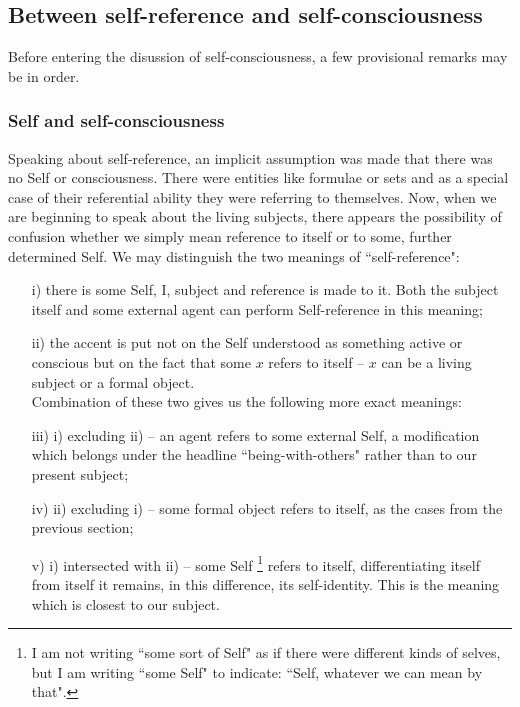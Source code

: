 \subsection{Between self-reference and self-consciousness}
Before entering the disussion of self-consciousness, a few provisional remarks may be in order.

\subsubsection{Self and self-consciousness}
Speaking about self-reference, an implicit assumption was made 
that there was no Self or consciousness. There were entities like formulae or sets and as a special case of their 
referential ability they were referring to themselves. Now, when we are beginning to speak about the living 
subjects, there appears the possibility of confusion whether we simply mean reference to itself or to some, further 
determined Self. We may distinguish the two meanings of ``self-reference":
\begin{enumerate}
\item[i)] \label{m:1} there is some Self, I, subject and reference is made to it. Both the subject itself and some external agent can 
perform Self-reference in this meaning;
\item[ii)] \label{m:2} the accent is put not on the Self understood as something active or conscious but on the fact that some $x$ 
refers to itself -- $x$ can be a living subject or a formal object. \\[1ex]
\noindent Combination of these two gives us the following more exact meanings:
\item[iii)] i) excluding ii) -- an agent refers to some external Self, a modification which belongs under the headline 
``being-with-others" rather than to our present subject;
\item[iv)] ii) excluding i) -- some formal object refers to itself, as the cases from the previous section;
\item[v)] i) intersected with ii) -- some Self \footnote{I am not writing ``some sort of Self" as if there were different kinds of 
selves, but I am writing ``some Self" to indicate: ``Self, whatever we can mean by that".}
refers to itself, 
differentiating itself from itself it remains, in this difference, its self-identity. This is the meaning  which is 
closest to our subject.
\end{enumerate}

